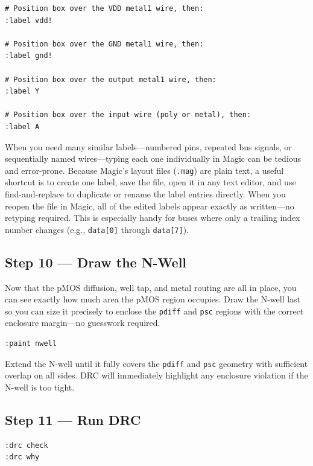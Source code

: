 \documentclass[11pt]{article}
\begin{document}
\begin{lstlisting}
# Position box over the VDD metal1 wire, then:
:label vdd!

# Position box over the GND metal1 wire, then:
:label gnd!

# Position box over the output metal1 wire, then:
:label Y

# Position box over the input wire (poly or metal), then:
:label A
\end{lstlisting}
\clearpage

\begin{tipbox}
When you need many similar labels---numbered pins, repeated bus
signals, or sequentially named wires---typing each one individually
in Magic can be tedious and error-prone.
Because Magic's layout files (\texttt{.mag}) are plain text, a useful
shortcut is to create one label, save the file, open it in any text
editor, and use find-and-replace to duplicate or rename the label
entries directly.
When you reopen the file in Magic, all of the edited labels appear
exactly as written---no retyping required.
This is especially handy for buses where only a trailing index number
changes (e.g., \texttt{data[0]} through \texttt{data[7]}).
\end{tipbox}

\subsection{Step 10 --- Draw the N-Well}

Now that the pMOS diffusion, well tap, and metal routing are all in
place, you can see exactly how much area the pMOS region occupies.
Draw the N-well last so you can size it precisely to enclose the
\texttt{pdiff} and \texttt{psc} regions with the correct enclosure
margin---no guesswork required.

\begin{lstlisting}
:paint nwell
\end{lstlisting}

Extend the N-well until it fully covers the \texttt{pdiff} and
\texttt{psc} geometry with sufficient overlap on all sides.
DRC will immediately highlight any enclosure violation if the N-well is
too tight.

\subsection{Step 11 --- Run DRC}

\begin{lstlisting}
:drc check
:drc why
\end{lstlisting}
\end{document}
